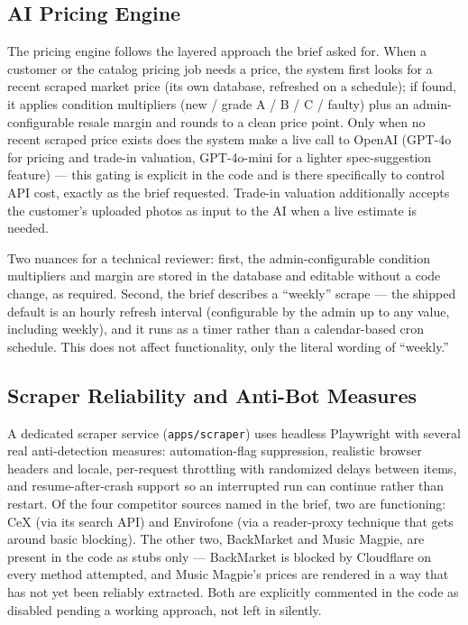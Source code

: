 \documentclass[11pt,a4paper]{article}
\begin{document}
\subsection{AI Pricing Engine}

The pricing engine follows the layered approach the brief asked for. When a customer or the catalog pricing job needs a price, the system first looks for a recent scraped market price (its own database, refreshed on a schedule); if found, it applies condition multipliers (new / grade A / B / C / faulty) plus an admin-configurable resale margin and rounds to a clean price point. Only when no recent scraped price exists does the system make a live call to OpenAI (GPT-4o for pricing and trade-in valuation, GPT-4o-mini for a lighter spec-suggestion feature) --- this gating is explicit in the code and is there specifically to control API cost, exactly as the brief requested. Trade-in valuation additionally accepts the customer's uploaded photos as input to the AI when a live estimate is needed.

Two nuances for a technical reviewer: first, the admin-configurable condition multipliers and margin are stored in the database and editable without a code change, as required. Second, the brief describes a ``weekly'' scrape --- the shipped default is an hourly refresh interval (configurable by the admin up to any value, including weekly), and it runs as a timer rather than a calendar-based cron schedule. This does not affect functionality, only the literal wording of ``weekly.''

\subsection{Scraper Reliability and Anti-Bot Measures}

A dedicated scraper service (\texttt{apps/scraper}) uses headless Playwright with several real anti-detection measures: automation-flag suppression, realistic browser headers and locale, per-request throttling with randomized delays between items, and resume-after-crash support so an interrupted run can continue rather than restart. Of the four competitor sources named in the brief, two are functioning: CeX (via its search API) and Envirofone (via a reader-proxy technique that gets around basic blocking). The other two, BackMarket and Music Magpie, are present in the code as stubs only --- BackMarket is blocked by Cloudflare on every method attempted, and Music Magpie's prices are rendered in a way that has not yet been reliably extracted. Both are explicitly commented in the code as disabled pending a working approach, not left in silently.
\end{document}
